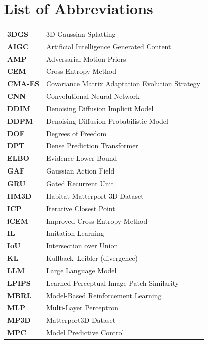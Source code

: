 \documentclass[12pt,a4paper,final]{extreport}
\begin{document}
\chapter*{List of Abbreviations}

\begingroup
{}
\begin{longtable}{p{2.6cm}l}
\textbf{3DGS} & 3D Gaussian Splatting \\
\textbf{AIGC} & Artificial Intelligence Generated Content \\
\textbf{AMP} & Adversarial Motion Priors \\
\textbf{CEM} & Cross-Entropy Method \\
\textbf{CMA-ES} & Covariance Matrix Adaptation Evolution Strategy \\
\textbf{CNN} & Convolutional Neural Network \\
\textbf{DDIM} & Denoising Diffusion Implicit Model \\
\textbf{DDPM} & Denoising Diffusion Probabilistic Model \\
\textbf{DOF} & Degrees of Freedom \\
\textbf{DPT} & Dense Prediction Transformer \\
\textbf{ELBO} & Evidence Lower Bound \\
\textbf{GAF} & Gaussian Action Field \\
\textbf{GRU} & Gated Recurrent Unit \\
\textbf{HM3D} & Habitat-Matterport 3D Dataset \\
\textbf{ICP} & Iterative Closest Point \\
\textbf{iCEM} & Improved Cross-Entropy Method \\
\textbf{IL} & Imitation Learning \\
\textbf{IoU} & Intersection over Union \\
\textbf{KL} & Kullback--Leibler (divergence) \\
\textbf{LLM} & Large Language Model \\
\textbf{LPIPS} & Learned Perceptual Image Patch Similarity \\
\textbf{MBRL} & Model-Based Reinforcement Learning \\
\textbf{MLP} & Multi-Layer Perceptron \\
\textbf{MP3D} & Matterport3D Dataset \\
\textbf{MPC} & Model Predictive Control \\

\end{longtable}
\end{document}
